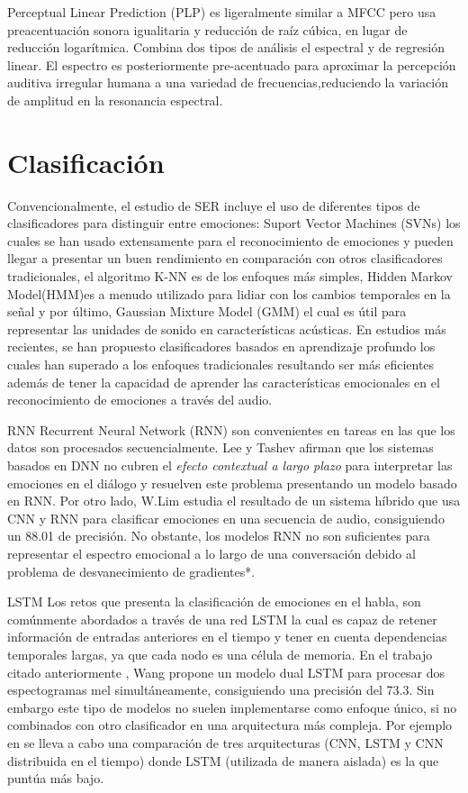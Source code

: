 \documentclass[11pt,a4paper,spanish]{book}
\begin{document}
	Perceptual Linear Prediction (PLP) es ligeralmente similar a MFCC pero usa preacentuación sonora igualitaria y reducción de raíz cúbica, en lugar de reducción logarítmica. Combina dos tipos de análisis el espectral y de regresión linear. El espectro es posteriormente pre-acentuado para aproximar la percepción auditiva irregular humana a una variedad de frecuencias,reduciendo la variación de amplitud en la resonancia espectral.
	
	\section{Clasificación}
	Convencionalmente, el estudio de SER incluye el uso de diferentes tipos de clasificadores para distinguir entre emociones: Suport Vector Machines (SVNs) los cuales se han usado extensamente para el reconocimiento de emociones y pueden llegar a presentar un buen rendimiento en comparación con otros clasificadores tradicionales, el algoritmo K-NN es de los enfoques más simples, Hidden Markov Model(HMM)es a menudo utilizado para lidiar con los cambios temporales en la señal y por último, Gaussian Mixture Model (GMM) el cual es útil para representar las unidades de sonido en características acústicas.
	En estudios más recientes, se han propuesto clasificadores basados en aprendizaje profundo los cuales han superado a los enfoques tradicionales resultando ser más eficientes además de tener la capacidad de aprender las características emocionales en el reconocimiento de emociones a través del audio.
	
	RNN 
	Recurrent Neural Network (RNN) son convenientes en tareas en las que los datos son procesados secuencialmente.
	Lee y Tashev \cite{Lee2015} afirman que los sistemas basados en DNN no cubren el \emph{efecto contextual a largo plazo} para interpretar las emociones en el diálogo y resuelven este problema presentando un modelo basado en RNN. Por otro lado, W.Lim \cite{Lim2017} estudia el resultado de un sistema híbrido que usa CNN y RNN para clasificar emociones en una secuencia de audio, consiguiendo un 88.01 de precisión.
	No obstante, los modelos RNN no son suficientes para representar el espectro emocional a lo largo de una conversación debido al problema de desvanecimiento de gradientes*.
	
	LSTM
	Los retos que presenta la clasificación de emociones en el habla, son comúnmente abordados a través de una red LSTM la cual es capaz de retener información de entradas anteriores en el tiempo y tener en cuenta dependencias temporales largas, ya que cada nodo es una célula de memoria.
	En el trabajo citado anteriormente \cite{Wang2020}, Wang propone un modelo dual LSTM para procesar dos espectogramas mel simultáneamente, consiguiendo una precisión del 73.3. 
	Sin embargo este tipo de modelos no suelen implementarse como enfoque único, si no combinados con otro clasificador en una arquitectura más compleja. Por ejemplo en \cite{Lim2017} se lleva a cabo una comparación de tres  arquitecturas (CNN, LSTM y CNN distribuida en el tiempo) donde LSTM (utilizada de manera aislada) es la que puntúa más bajo.	
	
\end{document}
